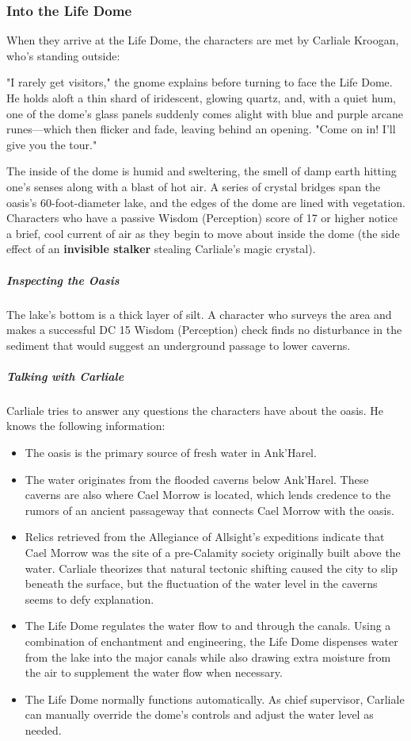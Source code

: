 \documentclass[10pt,a4paper,twoside,bg=print,twocolumn,openany,nodeprecatedcode]{dndbook}
\begin{document}
\subsubsection{Into the Life Dome}
When they arrive at the Life Dome, the characters are met by Carliale Kroogan, who's standing outside:

\begin{DndReadAloud}{}
"I rarely get visitors," the gnome explains before turning to face the Life Dome. He holds aloft a thin shard of iridescent, glowing quartz, and, with a quiet hum, one of the dome's glass panels suddenly comes alight with blue and purple arcane runes—which then flicker and fade, leaving behind an opening. "Come on in! I'll give you the tour."

\end{DndReadAloud}

The inside of the dome is humid and sweltering, the smell of damp earth hitting one's senses along with a blast of hot air. A series of crystal bridges span the oasis's 60-foot-diameter lake, and the edges of the dome are lined with vegetation. Characters who have a passive Wisdom (Perception) score of 17 or higher notice a brief, cool current of air as they begin to move about inside the dome (the side effect of an \textbf{invisible stalker} stealing Carliale's magic crystal).

\subparagraph{Inspecting the Oasis}
The lake's bottom is a thick layer of silt. A character who surveys the area and makes a successful DC 15 Wisdom (Perception) check finds no disturbance in the sediment that would suggest an underground passage to lower caverns.

\subparagraph{Talking with Carliale}
Carliale tries to answer any questions the characters have about the oasis. He knows the following information:


\begin{itemize}
\item The oasis is the primary source of fresh water in Ank'Harel.
\item The water originates from the flooded caverns below Ank'Harel. These caverns are also where Cael Morrow is located, which lends credence to the rumors of an ancient passageway that connects Cael Morrow with the oasis.
\item Relics retrieved from the Allegiance of Allsight's expeditions indicate that Cael Morrow was the site of a pre-Calamity society originally built above the water. Carliale theorizes that natural tectonic shifting caused the city to slip beneath the surface, but the fluctuation of the water level in the caverns seems to defy explanation.
\item The Life Dome regulates the water flow to and through the canals. Using a combination of enchantment and engineering, the Life Dome dispenses water from the lake into the major canals while also drawing extra moisture from the air to supplement the water flow when necessary.
\item The Life Dome normally functions automatically. As chief supervisor, Carliale can manually override the dome's controls and adjust the water level as needed.
\end{itemize}
\end{document}
